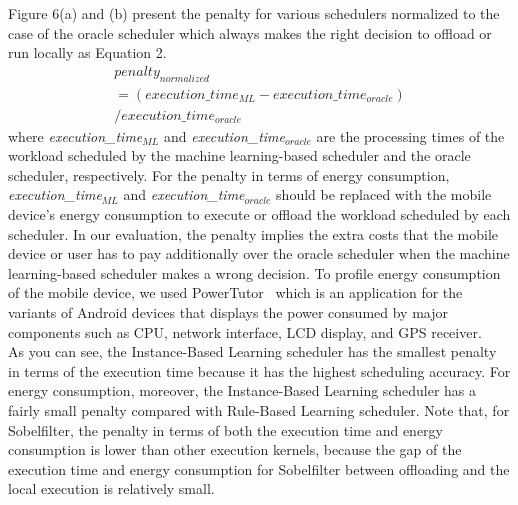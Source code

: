 \documentclass[10pt, conference, compsocconf]{IEEEtran}
\begin{document}
%
\indent Figure 6(a) and (b) present the penalty for various schedulers
normalized to the case of the oracle scheduler which always makes the
right decision to offload or run locally as Equation 2.
%
%
\begin{multline}
	penalty_{normalized} \\ 
			= (execution\_time_{ML} 
              - execution\_time_{oracle}) \\
                 / execution\_time_{oracle}
\end{multline}
%
where \textit{execution\_time$_{ML}$} and 
\textit{execution\_time$_{oracle}$} are the processing times 
of the workload scheduled by the machine learning-based scheduler 
and the oracle scheduler, respectively.
%
For the penalty in terms of energy consumption, 
\textit{execution\_time$_{ML}$} and \textit{execution\_time$_{oracle}$}
should be replaced with the mobile device's energy consumption to 
execute or offload the workload scheduled by each scheduler.
%
In our evaluation, the penalty implies the extra costs that the mobile
device or user has to pay additionally over the oracle scheduler when
the machine learning-based scheduler makes a wrong decision. 
%
To profile energy consumption of the mobile device, we used
PowerTutor~\cite{powertutor} which is an application for the variants of
Android devices that displays the power consumed by major components
such as CPU, network interface, LCD display, and GPS receiver.\\
%
\indent As you can see, the Instance-Based Learning scheduler has the smallest
penalty in terms of the execution time because it has the highest
scheduling accuracy.
%
For energy consumption, moreover, the Instance-Based Learning scheduler has
a fairly small penalty compared with Rule-Based Learning scheduler.
%  
Note that, for Sobelfilter, the penalty in terms of both the execution
time and energy consumption is lower than other execution kernels,
because the gap of the execution time and energy consumption for
Sobelfilter between offloading and the local execution is relatively
small.
\end{document}
